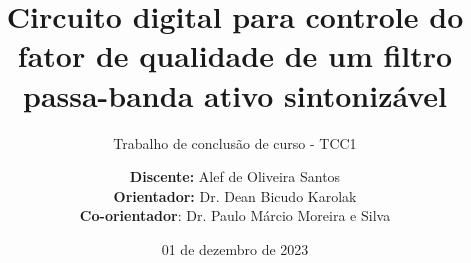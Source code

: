 \title[TCC1 - Alef de Oliveira Santos]{Circuito digital para controle do fator de qualidade de um filtro \\ passa-banda ativo sintonizável}

\subtitle{Trabalho de conclusão de curso - TCC1}

\author[Alef Santos]{\textbf{Discente:} Alef de Oliveira Santos \\ 
\textbf{Orientador:} Dr. Dean Bicudo Karolak\\
\textbf{Co-orientador}: Dr. Paulo Márcio Moreira e Silva}


\date{01 de dezembro de 2023}

